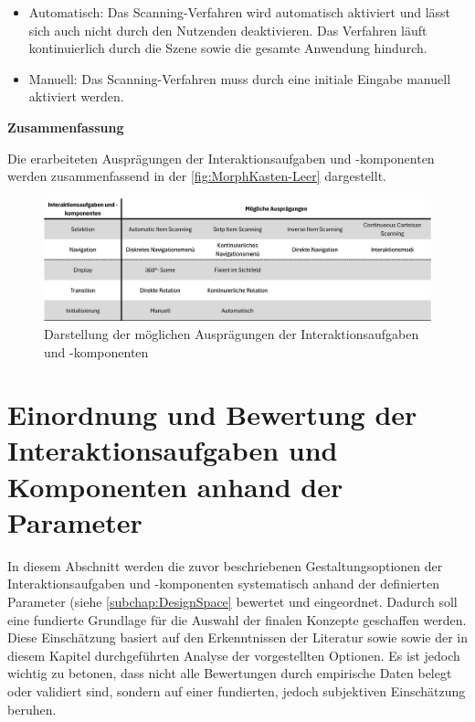 \begin{itemize}
    \item Automatisch: Das Scanning-Verfahren wird automatisch aktiviert und lässt sich auch nicht durch den Nutzenden deaktivieren. Das Verfahren läuft kontinuierlich durch die Szene sowie die gesamte Anwendung hindurch.
    \item Manuell: Das Scanning-Verfahren muss durch eine initiale Eingabe manuell aktiviert werden. 
\end{itemize}

{\normalfont \bfseries Zusammenfassung}

Die erarbeiteten Ausprägungen der Interaktionsaufgaben und -komponenten werden zusammenfassend in der \autoref{fig:MorphKasten-Leer} dargestellt. 

\begin{figure}[tbh]
    \centering
    \includegraphics[width=1.0\textwidth]{images/MorphKasten-Ausgang2.png}
    \caption{Darstellung der möglichen Ausprägungen der Interaktionsaufgaben und -komponenten}
    \label{fig:MorphKasten-Leer}
\end{figure}

\section{Einordnung und Bewertung der Interaktionsaufgaben und Komponenten anhand der Parameter}
\label{subchap:EinordnungNachParameter}

In diesem Abschnitt werden die zuvor beschriebenen Gestaltungsoptionen der Interaktionsaufgaben und -komponenten systematisch anhand der definierten Parameter (siehe \autoref{subchap:DesignSpace} bewertet und eingeordnet. Dadurch soll eine fundierte Grundlage für die Auswahl der finalen Konzepte geschaffen werden. Diese Einschätzung basiert auf den Erkenntnissen der Literatur sowie sowie der in diesem Kapitel durchgeführten Analyse der vorgestellten Optionen. Es ist jedoch wichtig zu betonen, dass nicht alle Bewertungen durch empirische Daten belegt oder validiert sind, sondern auf einer fundierten, jedoch subjektiven Einschätzung beruhen. 

